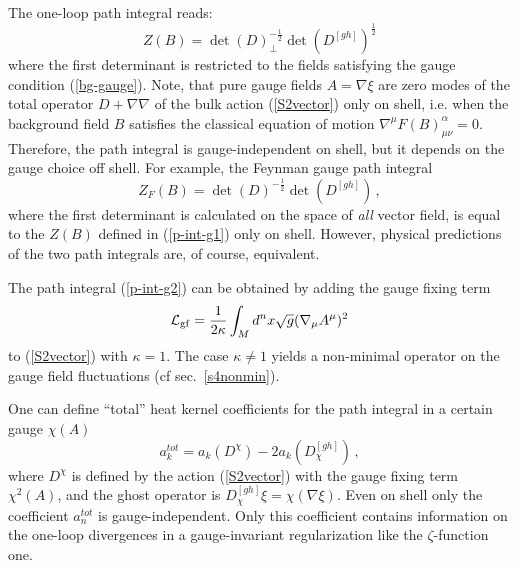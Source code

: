 The one-loop path integral reads:
\begin{equation}
Z(B)=\det (D)^{-\frac 12}_\perp \det (D^{[gh]})^{\frac 12}
\label{p-int-g1}
\end{equation}
where the first determinant is restricted to the fields
satisfying the gauge condition (\ref{bg-gauge}). Note, that
pure gauge fields $A=\nabla \xi$ are zero modes
of the total operator $D+\nabla \nabla $ of the bulk
action (\ref{S2vector}) only on shell, i.e. when the
background field $B$ satisfies the classical equation
of motion $\nabla^\mu F(B)_{\mu\nu}^\alpha =0$. Therefore,
the path integral is gauge-independent on shell, but it
depends on the gauge choice off shell. For
example, the Feynman gauge path integral
\begin{equation}
Z_F(B)=\det (D)^{-\frac 12} \det (D^{[gh]}) \,,
\label{p-int-g2}
\end{equation}
where the first determinant is calculated on the
space of {\it all} vector field, is equal to the
$Z(B)$ defined in (\ref{p-int-g1}) only on shell.
However, physical predictions of the two path integrals
are, of course, equivalent.

The path integral (\ref{p-int-g2}) can be obtained by adding
the gauge fixing term
\begin{equation}
{\mathcal{L}}_{\rm gf}=\frac 1{2\kappa} \int_M d^nx\sqrt{g} (\nabla_\mu A^\mu)^2
\label{Svgf}\end{equation}
to (\ref{S2vector}) with $\kappa=1$. The case $\kappa\ne 1$
yields a non-minimal operator on the gauge field fluctuations
(cf sec.\ \ref{s4nonmin}).

One can define ``total'' heat kernel coefficients
for the path integral in a certain gauge $\chi (A)$
\begin{equation}
a^{tot}_k =a_k(D^\chi )-2a_k( D^{[gh]}_\chi ) \,,
\label{atot}
\end{equation}
where $D^\chi$ is defined by the action (\ref{S2vector})
with the gauge fixing term $\chi^2(A)$, and the ghost
operator is $D^{[gh]}_\chi \xi =\chi (\nabla \xi )$.
Even on shell only the coefficient $a_n^{tot}$ is
gauge-independent. Only this coefficient contains
information on the one-loop divergences in a gauge-invariant
regularization like the $\zeta$-function one. 

